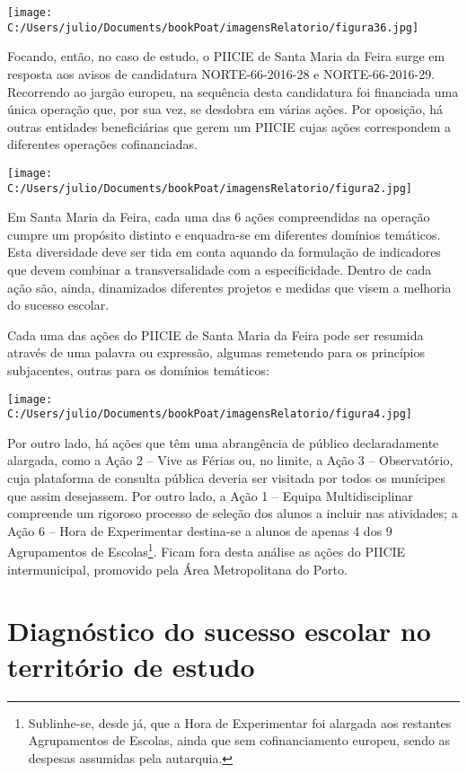 \documentclass[
]{book}
\begin{document}
\texttt{[image: C:/Users/julio/Documents/bookPoat/imagensRelatorio/figura36.jpg]}

Focando, então, no caso de estudo, o PIICIE de Santa Maria da Feira surge em resposta aos avisos de candidatura NORTE-66-2016-28 e NORTE-66-2016-29. Recorrendo ao jargão europeu, na sequência desta candidatura foi financiada uma única operação que, por sua vez, se desdobra em várias ações. Por oposição, há outras entidades beneficiárias que gerem um PIICIE cujas ações correspondem a diferentes operações cofinanciadas.

\texttt{[image: C:/Users/julio/Documents/bookPoat/imagensRelatorio/figura2.jpg]}

Em Santa Maria da Feira, cada uma das 6 ações compreendidas na operação cumpre um propósito distinto e enquadra-se em diferentes domínios temáticos. Esta diversidade deve ser tida em conta aquando da formulação de indicadores que devem combinar a transversalidade com a especificidade. Dentro de cada ação são, ainda, dinamizados diferentes projetos e medidas que visem a melhoria do sucesso escolar.

Cada uma das ações do PIICIE de Santa Maria da Feira pode ser resumida através de uma palavra ou expressão, algumas remetendo para os princípios subjacentes, outras para os domínios temáticos:

\texttt{[image: C:/Users/julio/Documents/bookPoat/imagensRelatorio/figura4.jpg]}

Por outro lado, há ações que têm uma abrangência de público declaradamente alargada, como a Ação 2 -- Vive as Férias ou, no limite, a Ação 3 -- Observatório, cuja plataforma de consulta pública deveria ser visitada por todos os munícipes que assim desejassem. Por outro lado, a Ação 1 -- Equipa Multidisciplinar compreende um rigoroso processo de seleção dos alunos a incluir nas atividades; a Ação 6 -- Hora de Experimentar destina-se a alunos de apenas 4 dos 9 Agrupamentos de Escolas\footnote{Sublinhe-se, desde já, que a Hora de Experimentar foi alargada aos restantes Agrupamentos de Escolas, ainda que sem cofinanciamento europeu, sendo as despesas assumidas pela autarquia.}. Ficam fora desta análise as ações do PIICIE intermunicipal, promovido pela Área Metropolitana do Porto.

\hypertarget{diagnuxf3stico-do-sucesso-escolar-no-territuxf3rio-de-estudo}{%
\chapter{Diagnóstico do sucesso escolar no território de estudo}\label{diagnuxf3stico-do-sucesso-escolar-no-territuxf3rio-de-estudo}}
\end{document}
